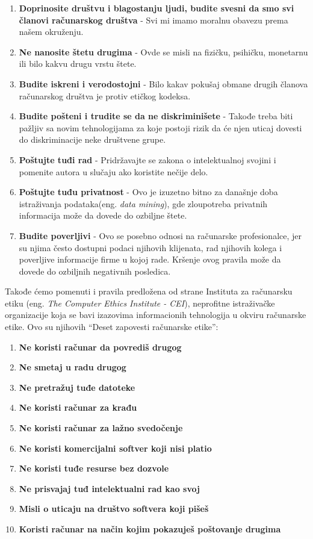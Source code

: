 \documentclass[a4paper]{article}
\begin{document}
\begin{enumerate}
	\item \textbf{Doprinosite društvu i blagostanju ljudi, budite svesni da smo svi članovi računarskog društva} - Svi mi imamo moralnu obavezu prema našem okruženju.
	\item \textbf{Ne nanosite štetu drugima} - Ovde se misli na fizičku, psihičku, monetarnu ili bilo kakvu drugu vrstu štete.
	\item \textbf{Budite iskreni i verodostojni} - Bilo kakav pokušaj obmane drugih članova računarskog društva je protiv etičkog kodeksa.
	\item \textbf{Budite pošteni i trudite se da ne diskriminišete} - Takođe treba biti pažljiv sa novim tehnologijama za koje postoji rizik da će njen uticaj dovesti do diskriminacije neke društvene grupe.
	\item \textbf{Poštujte tuđi rad} - Pridržavajte se zakona o intelektualnoj svojini i pomenite autora u slučaju ako koristite nečije delo.
	\item \textbf{Poštujte tuđu privatnost} - Ovo je izuzetno bitno za današnje doba istraživanja podataka(eng. \textit{data mining}), gde zloupotreba privatnih informacija može da dovede do ozbiljne štete.
	\item \textbf{Budite poverljivi} - Ovo se posebno odnosi na računarske profesionalce, jer su njima često dostupni podaci njihovih klijenata, rad njihovih kolega i poverljive informacije firme u kojoj rade. Kršenje ovog pravila može da dovede do ozbiljnih negativnih posledica.
\end{enumerate}


Takođe ćemo pomenuti i pravila predložena od strane Instituta za računarsku etiku (eng. \textit{The Computer Ethics Institute - CEI}), neprofitne istraživačke organizacije koja se bavi izazovima informacionih tehnologija u okviru računarske etike. Ovo su njihovih ``Deset zapovesti računarske etike''\cite{ice}:

\begin{enumerate}
	\item \textbf{Ne koristi računar da povrediš drugog}
	\item \textbf{Ne smetaj u radu drugog}
	\item \textbf{Ne pretražuj tuđe datoteke}
	\item \textbf{Ne koristi računar za krađu}
	\item \textbf{Ne koristi računar za lažno svedočenje}
	\item \textbf{Ne koristi komercijalni softver koji nisi platio}
	\item \textbf{Ne koristi tuđe resurse bez dozvole}
	\item \textbf{Ne prisvajaj tuđ intelektualni rad kao svoj}
	\item \textbf{Misli o uticaju na društvo softvera koji pišeš}
	\item \textbf{Koristi računar na način kojim pokazuješ poštovanje drugima}
\end{enumerate}
\end{document}

